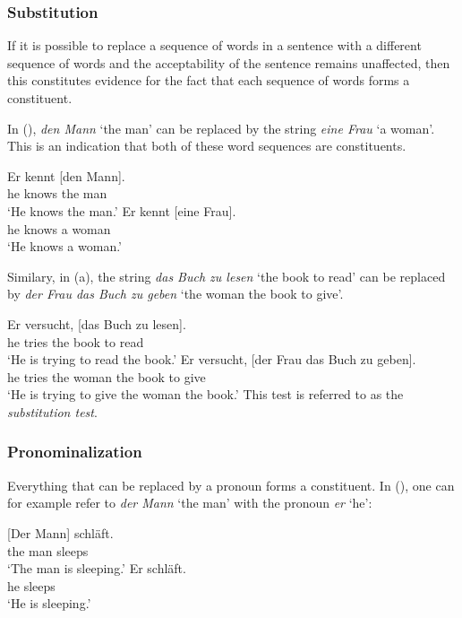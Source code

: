 {\subsubsection{Substitution}

If it is possible to replace a sequence of words in a sentence with a different sequence of words and the acceptability of the sentence 
remains unaffected, then this constitutes evidence for the fact that each sequence of words forms a constituent.

In (), \emph{den Mann} `the man' can be replaced by the string \emph{eine Frau} `a woman'. This is an indication that both of
these word sequences are constituents. 

\eal
\ex 
\gll Er kennt [den Mann].\\
     he knows \spacebr{}the man\\
\glt `He knows the man.'
\ex 
\gll Er kennt [eine Frau].\\
     he knows \spacebr{}a woman\\
\glt `He knows a woman.'
\zl

\noindent
Similary, in (a), the string \emph{das Buch zu lesen} `the book to read' can be replaced
by \emph{der Frau das Buch zu geben} `the woman the book to give'.

\eal
\ex\label{ex-das-buch-zu-lesen} 
\gll Er versucht, [das Buch zu lesen].\\
	 he tries \spacebr{}the book to read\\
\glt `He is trying to read the book.'
\ex 
\gll Er versucht, [der Frau das Buch zu geben].\\
	 he tries \spacebr{}the woman the book to give\\
\glt `He is trying to give the woman the book.'
\zl
%
This test is referred to as the \emph{substitution test}.


\subsubsection{Pronominalization}

Everything that can be replaced by a pronoun forms a constituent.
In (), one can for example refer to \emph{der Mann} `the man' with the pronoun \emph{er} `he':

\eal
\ex 
\gll {}[Der Mann] schläft.\\
	 {}\spacebr{}the man sleeps\\
\glt `The man is sleeping.'
\ex 
\gll Er schläft.\\
	 he sleeps\\
\glt `He is sleeping.'
\zl

}
